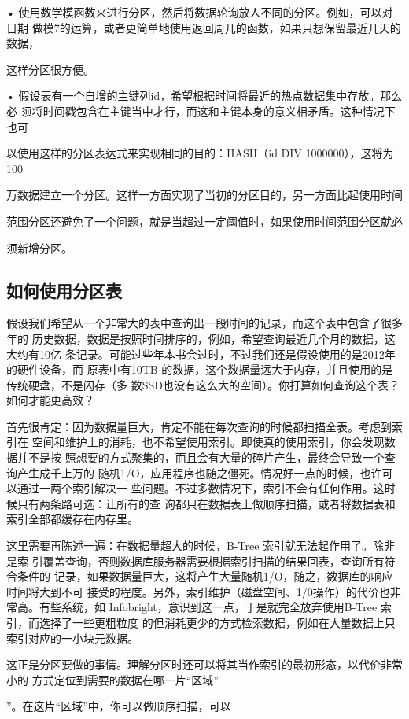 • 使用数学模函数来进行分区，然后将数据轮询放人不同的分区。例如，可以对日期
做模7的运算，或者更简单地使用返回周几的函数，如果只想保留最近几天的数据，

这样分区很方便。

• 假设表有一个自增的主键列id，希望根据时间将最近的热点数据集中存放。那么必
须将时间戳包含在主键当中才行，而这和主键本身的意义相矛盾。这种情况下也可

以使用这样的分区表达式来实现相同的目的：HASH（id DIV 1000000），这将为100

万数据建立一个分区。这样一方面实现了当初的分区目的，另一方面比起使用时间

范围分区还避免了一个问题，就是当超过一定阈值时，如果使用时间范围分区就必

须新增分区。

\subsection{如何使用分区表}
假设我们希望从一个非常大的表中查询出一段时间的记录，而这个表中包含了很多年的
历史数据，数据是按照时间排序的，例如，希望查询最近几个月的数据，这大约有10亿
条记录。可能过些年本书会过时，不过我们还是假设使用的是2012年的硬件设备，而
原表中有10TB 的数据，这个数据量远大于内存，并且使用的是传统硬盘，不是闪存（多
数SSD也没有这么大的空间）。你打算如何查询这个表？如何才能更高效？

首先很肯定：因为数据量巨大，肯定不能在每次查询的时候都扫描全表。考虑到索引在
空间和维护上的消耗，也不希望使用索引。即使真的使用索引，你会发现数据并不是按
照想要的方式聚集的，而且会有大量的碎片产生，最终会导致一个查询产生成千上万的
随机1/O，应用程序也随之僵死。情况好一点的时候，也许可以通过一两个索引解决一
些问题。不过多数情况下，索引不会有任何作用。这时候只有两条路可选：让所有的查
询都只在数据表上做顺序扫描，或者将数据表和索引全部都缓存在内存里。

这里需要再陈述一遍：在数据量超大的时候，B-Tree 索引就无法起作用了。除非是索
引覆盖查询，否则数据库服务器需要根据索引扫描的结果回表，查询所有符合条件的
记录，如果数据量巨大，这将产生大量随机1/O，随之，数据库的响应时间将大到不可
接受的程度。另外，索引维护（磁盘空间、1/0操作）的代价也非常高。有些系统，如
Infobright，意识到这一点，于是就完全放弃使用B-Tree 索引，而选择了一些更粗粒度
的但消耗更少的方式检索数据，例如在大量数据上只索引对应的一小块元数据。

这正是分区要做的事情。理解分区时还可以将其当作索引的最初形态，以代价非常小的
方式定位到需要的数据在哪一片“区域”

”。在这片“区域”中，你可以做顺序扫描，可以

